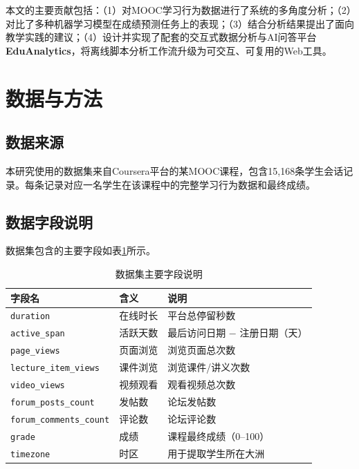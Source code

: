 \documentclass[UTF8, 12pt, a4paper]{ctexart}
\begin{document}
本文的主要贡献包括：（1）对MOOC学习行为数据进行了系统的多角度分析；（2）对比了多种机器学习模型在成绩预测任务上的表现；（3）结合分析结果提出了面向教学实践的建议；（4）设计并实现了配套的交互式数据分析与AI问答平台\textbf{EduAnalytics}，将离线脚本分析工作流升级为可交互、可复用的Web工具。

\section{数据与方法}

\subsection{数据来源}

本研究使用的数据集来自Coursera平台的某MOOC课程，包含15,168条学生会话记录。每条记录对应一名学生在该课程中的完整学习行为数据和最终成绩。

\subsection{数据字段说明}

数据集包含的主要字段如表\ref{tab:fields}所示。

\begin{table}[H]
\centering
\caption{数据集主要字段说明}
\label{tab:fields}
\begin{tabular}{lll}
\toprule
\textbf{字段名} & \textbf{含义} & \textbf{说明} \\
\midrule
\texttt{duration} & 在线时长 & 平台总停留秒数 \\
\texttt{active\_span} & 活跃天数 & 最后访问日期 $-$ 注册日期（天） \\
\texttt{page\_views} & 页面浏览 & 浏览页面总次数 \\
\texttt{lecture\_item\_views} & 课件浏览 & 浏览课件/讲义次数 \\
\texttt{video\_views} & 视频观看 & 观看视频总次数 \\
\texttt{forum\_posts\_count} & 发帖数 & 论坛发帖数 \\
\texttt{forum\_comments\_count} & 评论数 & 论坛评论数 \\
\texttt{grade} & 成绩 & 课程最终成绩（0--100） \\
\texttt{timezone} & 时区 & 用于提取学生所在大洲 \\
\bottomrule
\end{tabular}
\end{table}
\end{document}
